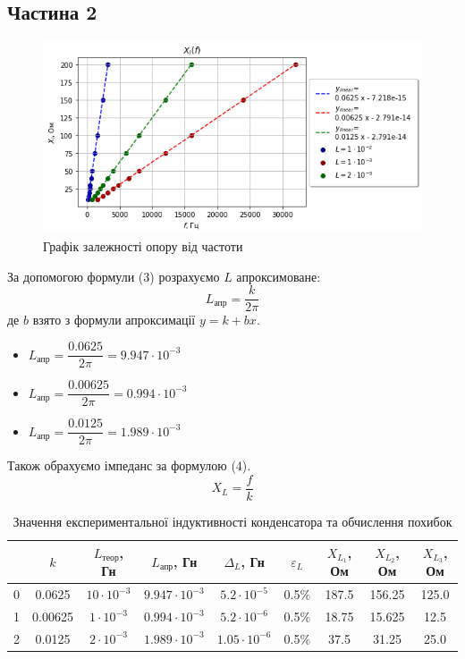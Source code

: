 \documentclass[a4paper,12pt]{article}
\begin{document}
\begin{justify}
\subsection*{Частина 2} 
\begin{figure}[h!]
		\begin{center}
			\includegraphics[scale=0.8]{media/graph16}
		\end{center}
		\caption{Графік залежності опору від частоти}
		\label{Picture_1}
	\end{figure}
	За допомогою формули (3) розрахуємо $L$ апроксимоване:
	\begin{equation}
		L_{\textrm{апр}}=\dfrac{k}{2\pi}
	\end{equation}
	де $b$ взято з формули апроксимації $y=k+{b}{x}$.
	\begin{itemize}
		\item $L_{\textrm{апр}}=\dfrac{0.0625}{2\pi}=9.947\cdot10^{-3}$
		\item $L_{\textrm{апр}}=\dfrac{0.00625}{2\pi}=0.994\cdot10^{-3}$
		\item $L_{\textrm{апр}}=\dfrac{0.0125}{2\pi}=1.989\cdot10^{-3}$
	\end{itemize}
	Також обрахуємо імпеданс за формулою (4).
	\begin{equation}
		X_L=\dfrac{f}{k}
	\end{equation}
\begin{table}[htp]
	\begin{flushright}
		\caption{Значення експериментальної індуктивності конденсатора та обчислення похибок}
	\end{flushright}
\begin{tabular}{|c|c|c|c|c|c|c|c|c|}
\hline
  & $k$     & $L_{\textrm{теор}}$, Гн & $L_{\textrm{апр}}$, Гн & $\Delta_L$, Гн     & $\varepsilon_L$ & $X_{L_1}$, Ом & $X_{L_2}$, Ом & $X_{L_3}$, Ом \\ \hline
0 & 0.0625  & $10\cdot10^{-3}$        & $9.947\cdot10^{-3}$    & $5.2\cdot10^{-5}$  & 0.5\%           & 187.5         & 156.25        & 125.0         \\ \hline
1 & 0.00625 & $1\cdot10^{-3}$         & $0.994\cdot10^{-3}$    & $5.2\cdot10^{-6}$  & 0.5\%           & 18.75         & 15.625        & 12.5          \\ \hline
2 & 0.0125  & $2\cdot10^{-3}$         & $1.989\cdot10^{-3}$    & $1.05\cdot10^{-6}$ & 0.5\%           & 37.5          & 31.25         & 25.0          \\ \hline
\end{tabular}
\end{table}
    

\end{justify}
\end{document}
